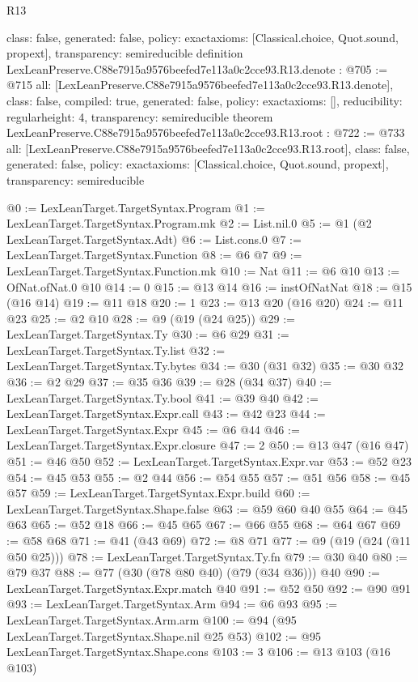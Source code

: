 \begin{lexlean}{R13}
\begin{coremodule}
{  class: false,
  generated: false,
  policy: exact{axioms: [Classical.choice, Quot.sound, propext]},
  transparency: semireducible
}
definition LexLeanPreserve.C88e7915a9576beefed7e113a0c2cce93.R13.denote : @705 := @715 {
  all: [LexLeanPreserve.C88e7915a9576beefed7e113a0c2cce93.R13.denote],
  class: false,
  compiled: true,
  generated: false,
  policy: exact{axioms: []},
  reducibility: regular{height: 4},
  transparency: semireducible
}
theorem LexLeanPreserve.C88e7915a9576beefed7e113a0c2cce93.R13.root : @722 := @733 {
  all: [LexLeanPreserve.C88e7915a9576beefed7e113a0c2cce93.R13.root],
  class: false,
  generated: false,
  policy: exact{axioms: [Classical.choice, Quot.sound, propext]},
  transparency: semireducible
}

@0 := LexLeanTarget.TargetSyntax.Program
@1 := LexLeanTarget.TargetSyntax.Program.mk
@2 := List.nil.{0}
@5 := @1 (@2 LexLeanTarget.TargetSyntax.Adt)
@6 := List.cons.{0}
@7 := LexLeanTarget.TargetSyntax.Function
@8 := @6 @7
@9 := LexLeanTarget.TargetSyntax.Function.mk
@10 := Nat
@11 := @6 @10
@13 := OfNat.ofNat.{0} @10
@14 := 0
@15 := @13 @14
@16 := instOfNatNat
@18 := @15 (@16 @14)
@19 := @11 @18
@20 := 1
@23 := @13 @20 (@16 @20)
@24 := @11 @23
@25 := @2 @10
@28 := @9 (@19 (@24 @25))
@29 := LexLeanTarget.TargetSyntax.Ty
@30 := @6 @29
@31 := LexLeanTarget.TargetSyntax.Ty.list
@32 := LexLeanTarget.TargetSyntax.Ty.bytes
@34 := @30 (@31 @32)
@35 := @30 @32
@36 := @2 @29
@37 := @35 @36
@39 := @28 (@34 @37)
@40 := LexLeanTarget.TargetSyntax.Ty.bool
@41 := @39 @40
@42 := LexLeanTarget.TargetSyntax.Expr.call
@43 := @42 @23
@44 := LexLeanTarget.TargetSyntax.Expr
@45 := @6 @44
@46 := LexLeanTarget.TargetSyntax.Expr.closure
@47 := 2
@50 := @13 @47 (@16 @47)
@51 := @46 @50
@52 := LexLeanTarget.TargetSyntax.Expr.var
@53 := @52 @23
@54 := @45 @53
@55 := @2 @44
@56 := @54 @55
@57 := @51 @56
@58 := @45 @57
@59 := LexLeanTarget.TargetSyntax.Expr.build
@60 := LexLeanTarget.TargetSyntax.Shape.false
@63 := @59 @60 @40 @55
@64 := @45 @63
@65 := @52 @18
@66 := @45 @65
@67 := @66 @55
@68 := @64 @67
@69 := @58 @68
@71 := @41 (@43 @69)
@72 := @8 @71
@77 := @9 (@19 (@24 (@11 @50 @25)))
@78 := LexLeanTarget.TargetSyntax.Ty.fn
@79 := @30 @40
@80 := @79 @37
@88 := @77 (@30 (@78 @80 @40) (@79 (@34 @36))) @40
@90 := LexLeanTarget.TargetSyntax.Expr.match @40
@91 := @52 @50
@92 := @90 @91
@93 := LexLeanTarget.TargetSyntax.Arm
@94 := @6 @93
@95 := LexLeanTarget.TargetSyntax.Arm.arm
@100 := @94 (@95 LexLeanTarget.TargetSyntax.Shape.nil @25 @53)
@102 := @95 LexLeanTarget.TargetSyntax.Shape.cons
@103 := 3
@106 := @13 @103 (@16 @103)

\end{coremodule}
\end{lexlean}
